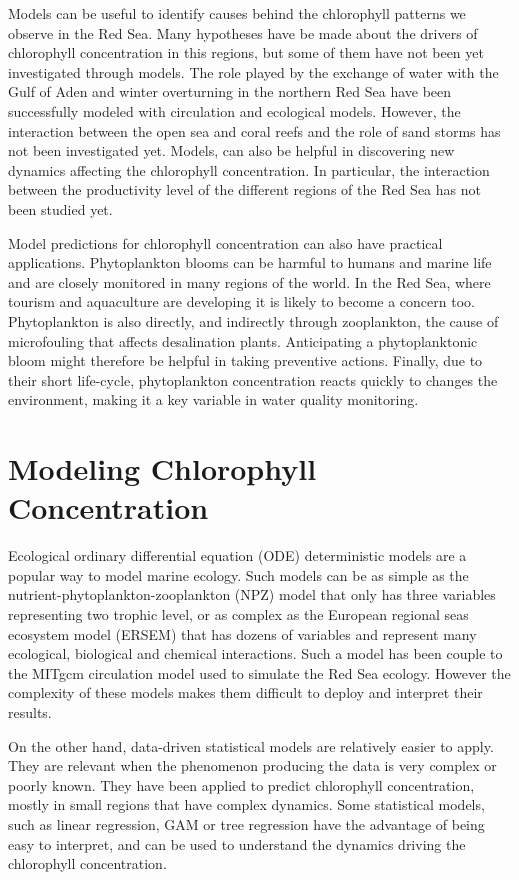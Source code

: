 Models can be useful to identify causes behind the chlorophyll patterns we observe in the Red Sea. Many hypotheses have be made about the drivers of chlorophyll concentration in this regions, but some of them have not been yet investigated through models. The role played by the exchange of water with the Gulf of Aden and winter overturning in the northern Red Sea have been successfully modeled with circulation and ecological models. However, the interaction between the open sea and coral reefs and the role of sand storms has not been investigated yet. Models, can also be helpful in discovering new dynamics affecting the chlorophyll concentration. In particular, the interaction between the productivity level of the different regions of the Red Sea has not been studied yet.  

Model predictions for chlorophyll concentration can also have practical applications. Phytoplankton blooms can be harmful to humans and marine life and are closely monitored in many regions of the world. In the Red Sea, where tourism and aquaculture are developing it is likely to become a concern too. Phytoplankton is also directly, and indirectly through zooplankton, the cause of microfouling that affects desalination plants. Anticipating a phytoplanktonic bloom might therefore be helpful in taking preventive actions. Finally, due to their short life-cycle, phytoplankton concentration reacts quickly to changes the environment, making it a  key variable in water quality monitoring.

\section{Modeling Chlorophyll Concentration}

Ecological ordinary differential equation (ODE) deterministic models are a popular way to model marine ecology. Such models can be as simple as the nutrient-phytoplankton-zooplankton (NPZ) model that only has three variables representing two trophic level, or as complex as the European regional seas ecosystem model (ERSEM) that has dozens of variables and represent many ecological, biological and chemical interactions. Such a model has been couple to the MITgcm circulation model used to simulate the Red Sea ecology. However the complexity of these models makes them difficult to deploy and interpret their results. 

On the other hand, data-driven statistical models are relatively easier to apply. They are relevant when the phenomenon producing the data is very complex or poorly known. They have been applied to predict chlorophyll concentration, mostly in small regions that have complex dynamics. Some statistical models, such as linear regression, GAM or tree regression have the advantage of being easy to interpret, and can be used to understand the dynamics driving the chlorophyll concentration.

